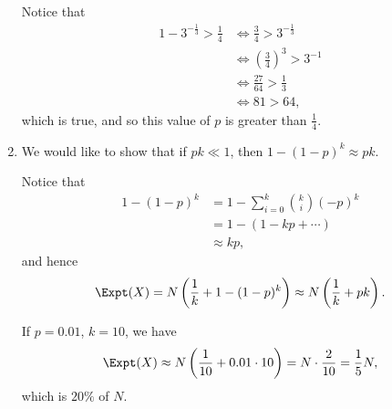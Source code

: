 \begin{enumerate}
          Notice that
          \begin{align*}
              1 - 3^{-\frac{1}{3}} > \frac{1}{4} & \iff \frac{3}{4} > 3^{-\frac{1}{3}}      \\
                                                 & \iff \left(\frac{3}{4}\right)^3 > 3^{-1} \\
                                                 & \iff \frac{27}{64} > \frac{1}{3}         \\
                                                 & \iff 81 > 64,
          \end{align*}
          which is true, and so this value of \(p\) is greater than \(\frac{1}{4}\).

    \item We would like to show that if \(pk \ll 1\), then \(1 - (1 - p)^k \approx pk\).

          Notice that
          \begin{align*}
              1 - (1 - p)^k & = 1 - \sum_{i = 0}^{k} \binom{k}{i} (-p)^k \\
                            & = 1 - \left(1 - kp + \cdots\right)         \\
                            & \approx kp,
          \end{align*}
          and hence
          \[
              \Expt(X) = N \left(\frac{1}{k} + 1 - (1 - p)^k\right) \approx N \left(\frac{1}{k} + pk\right).
          \]

          If \(p = 0.01\), \(k = 10\), we have
          \[
              \Expt(X) \approx N \left(\frac{1}{10} + 0.01 \cdot 10\right) = N \cdot \frac{2}{10} = \frac{1}{5} N,
          \]
          which is \(20\%\) of \(N\).
\end{enumerate}